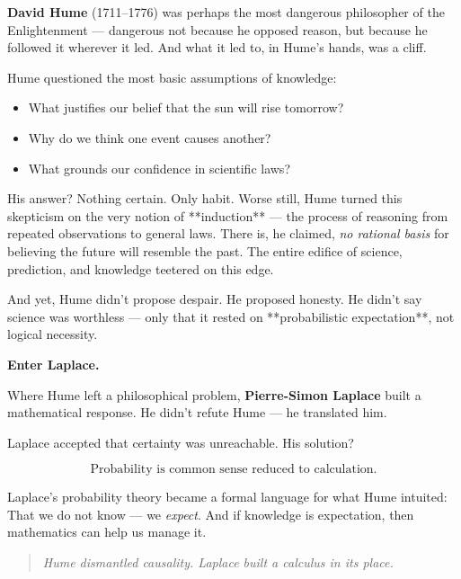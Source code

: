 \begin{tcolorbox}[colback=gray!5!white, colframe=black!75!white, title={Historical Sidebar: David Hume and the Uncertainty Engine}]

    \textbf{David Hume} (1711–1776) was perhaps the most dangerous philosopher of the Enlightenment — dangerous not because he opposed reason, but because he followed it wherever it led.  And what it led to, in Hume’s hands, was a cliff.
    
    \medskip
    
    Hume questioned the most basic assumptions of knowledge:

    \medskip

    \begin{itemize}
        \item What justifies our belief that the sun will rise tomorrow?
        \item Why do we think one event causes another?
        \item What grounds our confidence in scientific laws?
    \end{itemize}

    \medskip
    
    His answer? Nothing certain. Only habit.  Worse still, Hume turned this skepticism on the very notion of **induction** — the process of reasoning from repeated observations to general laws. There is, he claimed, \textit{no rational basis} for believing the future will resemble the past. The entire edifice of science, prediction, and knowledge teetered on this edge.
    
    \medskip
    
    And yet, Hume didn’t propose despair. He proposed honesty. He didn’t say science was worthless — only that it rested on **probabilistic expectation**, not logical necessity.

    \medskip
    
    \textbf{Enter Laplace.}

    \medskip
    
    Where Hume left a philosophical problem, \textbf{Pierre-Simon Laplace} built a mathematical response. He didn’t refute Hume — he translated him.

    \medskip
    
    Laplace accepted that certainty was unreachable. His solution?
    
    \[
    \text{Probability is common sense reduced to calculation.}
    \]
    
    Laplace’s probability theory became a formal language for what Hume intuited:  
    That we do not know — we \textit{expect}. And if knowledge is expectation, then mathematics can help us manage it.
    
    \begin{quote}
    \textit{Hume dismantled causality. Laplace built a calculus in its place.}
    \end{quote}
    
\end{tcolorbox}
    

